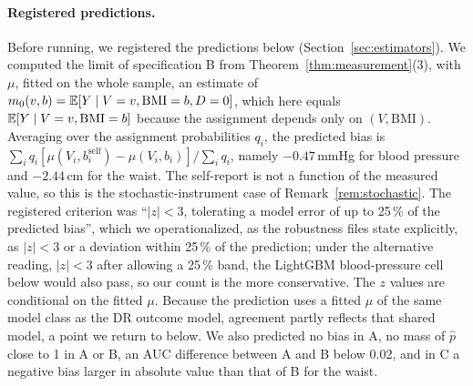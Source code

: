 \paragraph{Registered predictions.} Before running, we registered the predictions below (Section~\ref{sec:estimators}). We computed the limit of specification B from Theorem~\ref{thm:measurement}(3), with $\mu$, fitted on the whole sample, an estimate of $m_0(v,b)=\mathbb{E}[Y\mid V=v,\mathrm{BMI}=b,D=0]$, which here equals $\mathbb{E}[Y\mid V=v,\mathrm{BMI}=b]$ because the assignment depends only on $(V,\mathrm{BMI})$. Averaging over the assignment probabilities $q_i$, the predicted bias is $\sum_iq_i[\mu(V_i,b_i^{\mathrm{self}})-\mu(V_i,b_i)]/\sum_iq_i$, namely $-0.47$\,mmHg for blood pressure and $-2.44$\,cm for the waist. The self-report is not a function of the measured value, so this is the stochastic-instrument case of Remark~\ref{rem:stochastic}. The registered criterion was ``$|z|<3$, tolerating a model error of up to 25\,\% of the predicted bias'', which we operationalized, as the robustness files state explicitly, as $|z|<3$ or a deviation within 25\,\% of the prediction; under the alternative reading, $|z|<3$ after allowing a 25\,\% band, the LightGBM blood-pressure cell below would also pass, so our count is the more conservative. The $z$ values are conditional on the fitted $\mu$. Because the prediction uses a fitted $\mu$ of the same model class as the DR outcome model, agreement partly reflects that shared model, a point we return to below. We also predicted no bias in A, no mass of $\hat p$ close to 1 in A or B, an AUC difference between A and B below 0.02, and in C a negative bias larger in absolute value than that of B for the waist.

\begin{table}[ht]
\centering
\caption{NHANES, base design (200 replications). Mean bias of the DR and H\'ajek estimators; Monte Carlo errors of the DR bias in parentheses. No replication had any target individual with $\hat p>0.99$. The outcome standard deviations in the population are 19.7\,mmHg and 17.1\,cm.}\label{tab:nhanes}
\end{table}

